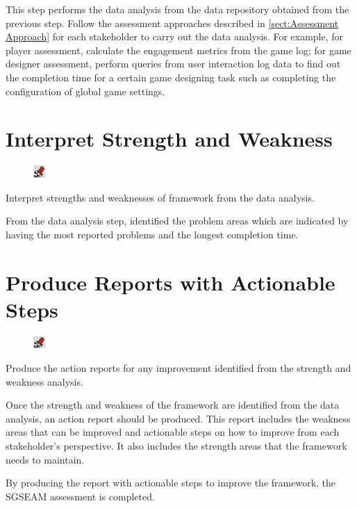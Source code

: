 \documentclass[11pt,oneside]{book}
\begin{document}
This step performs the data analysis from the data repository obtained from the previous step. Follow the assessment approaches described in \autoref{sect:Assessment Approach} for each stakeholder to carry out the data analysis. For example, for player assessment, calculate the 
engagement metrics from the game log; for game designer assessment, perform queries from user interaction log data to find out the completion time for a certain game designing task such as completing the configuration of global game settings. 

\section{Interpret Strength and Weakness}
\begin{shadebox}
\begin{figure}
\vspace{-15pt}\hspace{-10pt}
    \includegraphics[width=0.04\textwidth]{note-icon}
\end{figure}
Interpret strengths and weaknesses of framework from the data analysis.
\end{shadebox}

From the data analysis step, identified the problem areas which are indicated by having the most reported problems and the 
longest completion time. 

\section{Produce Reports with Actionable Steps}
\begin{shadebox}
\begin{figure}
\vspace{-15pt}\hspace{-10pt}
    \includegraphics[width=0.04\textwidth]{note-icon}
\end{figure}
Produce the action reports for any improvement identified from the strength and weakness analysis.
\end{shadebox}

Once the strength and weakness of the framework are identified from the data analysis, an action report should be produced. 
This report includes the weakness areas that can be improved and actionable steps on how to improve from 
each stakeholder's perspective. It also includes the strength areas that the framework needs to maintain.

By producing the report with actionable steps to improve the framework, the SGSEAM assessment is completed.  



\end{document}
